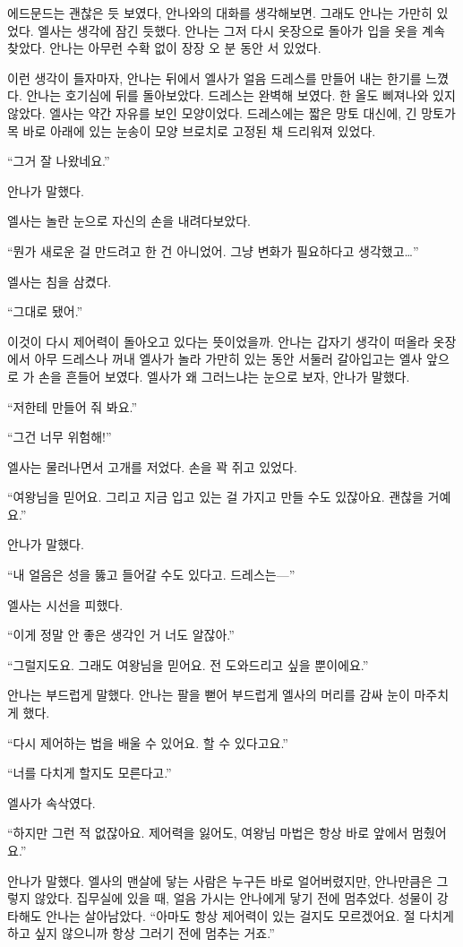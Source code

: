 에드문드는 괜찮은 듯 보였다, 안나와의 대화를 생각해보면. 그래도 안나는 가만히 있었다. 엘사는 생각에 잠긴 듯했다. 안나는 그저 다시 옷장으로 돌아가 입을 옷을 계속 찾았다. 안나는 아무런 수확 없이 장장 오 분 동안 서 있었다.

이런 생각이 들자마자, 안나는 뒤에서 엘사가 얼음 드레스를 만들어 내는 한기를 느꼈다. 안나는 호기심에 뒤를 돌아보았다. 드레스는 완벽해 보였다. 한 올도 삐져나와 있지 않았다. 엘사는 약간 자유를 보인 모양이었다. 드레스에는 짧은 망토 대신에, 긴 망토가 목 바로 아래에 있는 눈송이 모양 브로치로 고정된 채 드리워져 있었다.

``그거 잘 나왔네요.''

안나가 말했다.

엘사는 놀란 눈으로 자신의 손을 내려다보았다.

``뭔가 새로운 걸 만드려고 한 건 아니었어. 그냥 변화가 필요하다고 생각했고\ldots''

엘사는 침을 삼켰다.

``그대로 됐어.''

이것이 다시 제어력이 돌아오고 있다는 뜻이었을까. 안나는 갑자기 생각이 떠올라 옷장에서 아무 드레스나 꺼내 엘사가 놀라 가만히 있는 동안 서둘러 갈아입고는 엘사 앞으로 가 손을 흔들어 보였다. 엘사가 왜 그러느냐는 눈으로 보자, 안나가 말했다.

``저한테 만들어 줘 봐요.''

``그건 너무 위험해!''

엘사는 물러나면서 고개를 저었다. 손을 꽉 쥐고 있었다.

``여왕님을 믿어요. 그리고 지금 입고 있는 걸 가지고 만들 수도 있잖아요. 괜찮을 거예요.''

안나가 말했다.

``내 얼음은 성을 뚫고 들어갈 수도 있다고. 드레스는—''

엘사는 시선을 피했다.

``이게 정말 안 좋은 생각인 거 너도 알잖아.''

``그럴지도요. 그래도 여왕님을 믿어요. 전 도와드리고 싶을 뿐이에요.''

안나는 부드럽게 말했다. 안나는 팔을 뻗어 부드럽게 엘사의 머리를 감싸 눈이 마주치게 했다.

``다시 제어하는 법을 배울 수 있어요. 할 수 있다고요.''

``너를 다치게 할지도 모른다고.''

엘사가 속삭였다.

``하지만 그런 적 없잖아요. 제어력을 잃어도, 여왕님 마법은 항상 바로 앞에서 멈췄어요.''

안나가 말했다. 엘사의 맨살에 닿는 사람은 누구든 바로 얼어버렸지만, 안나만큼은 그렇지 않았다. 집무실에 있을 때, 얼음 가시는 안나에게 닿기 전에 멈추었다. 성물이 강타해도 안나는 살아남았다. ``아마도 항상 제어력이 있는 걸지도 모르겠어요. 절 다치게 하고 싶지 않으니까 항상 그러기 전에 멈추는 거죠.''

